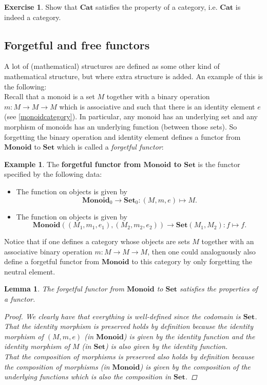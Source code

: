 \documentclass[a4paper,10pt]{scrartcl}
\theoremstyle{plain}
\newtheorem{lemma}[thm]{Lemma}
\theoremstyle{definition}
\newtheorem{exa}[thm]{Example}
\newtheorem{exer}[thm]{Exercise}
\newcommand{\Catb}[1]{\mathbf{#1}}
\newcommand{\SET}{\Catb{Set}}
\newcommand{\CAT}{\Catb{Cat}}
\newcommand{\MON}{\Catb{Monoid}}
\newcommand{\Ob}[1]{{#1}_0}
\newcommand{\CHom}[3]{{#1}(#2,#3)}
\begin{document}
\begin{exer} Show that $\CAT$ satisfies the property of a category, i.e. $\CAT$ is indeed a category.
\end{exer}

\subsection{Forgetful and free functors}
A lot of (mathematical) structures are defined as some other kind of mathematical structure, but where extra structure is added. An example of this is the following:\\
Recall that a monoid is a set $M$ together with a binary operation $m:M\to M\to M$ which is associative and such that there is an identity element $e$ (see \cref{monoidcategory}). In particular, any monoid has an underlying set and any morphism of monoids has an underlying function (between those sets). So forgetting the binary operation and identity element defines a functor from $\MON$ to $\SET$ which is called a \textit{forgetful functor}:
\begin{exa}\label{example:forgetful_montoset} The \textbf{forgetful functor from $\MON$ to $\SET$} is the functor specified by the following data:
\begin{itemize}
\item The function on objects is given by 
\[
\Ob{\MON}\to \Ob{\SET}: (M,m,e)\mapsto M.
\]
\item The function on objects is given by
\[
\CHom{\MON}{(M_1,m_1,e_1)}{(M_2,m_2,e_2)} \to \CHom{\SET}{M_1}{M_2} : f\mapsto f.
\]
\end{itemize}
\end{exa}
Notice that if one defines a category whose objects are sets $M$ together with an associative binary operation $m:M\to M\to M$, then one could analoguously also define a forgetful functor from $\MON$ to this category by only forgetting the neutral element.

\begin{lemma} The forgetful functor from $\MON$ to $\SET$ satisfies the properties of a functor.
\begin{proof}
We clearly have that everything is well-defined since the codomain is $\SET$.\\
That the identity morphism is preserved holds by definition because the identity morphism of $(M,m,e)$ (in $\MON$) is given by the identity function and the identity morphism of $M$ (in $\SET$) is also given by the identity function.\\
That the composition of morphisms is preserved also holds by definition because the composition of morphisms (in $\MON$) is given by the composition of the underlying functions which is also the composition in $\SET$.
\end{proof}
\end{lemma}
\end{document}
